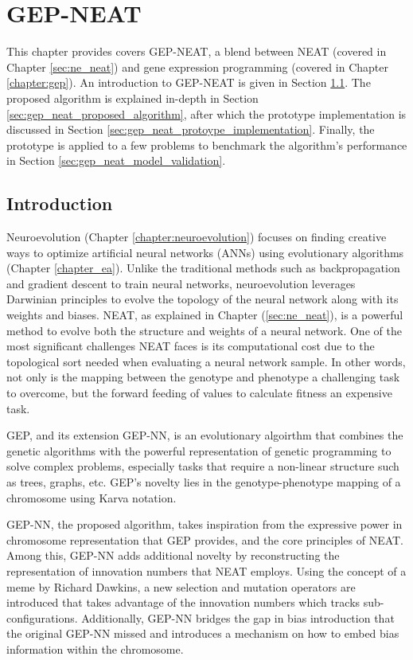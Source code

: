 \chapter{GEP-NEAT}\label{chapter:gep_neat}
This chapter provides covers GEP-NEAT, a blend between NEAT (covered in Chapter \ref{sec:ne_neat}) and gene expression programming (covered in Chapter \ref{chapter:gep}). An introduction to GEP-NEAT is given in Section \ref{sec:gep_neat_introduction}. The proposed algorithm is explained in-depth in Section \ref{sec:gep_neat_proposed_algorithm}, after which the prototype implementation is discussed in Section \ref{sec:gep_neat_protoype_implementation}. Finally, the prototype is applied to a few problems to benchmark the algorithm's performance in Section \ref{sec:gep_neat_model_validation}.

\section{Introduction}\label{sec:gep_neat_introduction}
Neuroevolution (Chapter \ref{chapter:neuroevolution}) focuses on finding creative ways to optimize artificial neural networks (ANNs) using evolutionary algorithms (Chapter \ref{chapter_ea}). Unlike the traditional methods such as backpropagation and gradient descent to train neural networks, neuroevolution leverages Darwinian principles to evolve the topology of the neural network along with its weights and biases. NEAT, as explained in Chapter (\ref{sec:ne_neat}), is a powerful method to evolve both the structure and weights of a neural network. One of the most significant challenges NEAT faces is its computational cost due to the topological sort needed when evaluating a neural network sample. In other words, not only is the mapping between the genotype and phenotype a challenging task to overcome, but the forward feeding of values to calculate fitness an expensive task. \bigskip

\noindent GEP, and its extension GEP-NN, is an evolutionary algoirthm that combines the genetic algorithms with the powerful representation of genetic programming to solve complex problems, especially tasks that require a non-linear structure such as trees, graphs, etc. GEP's novelty lies in the genotype-phenotype mapping of a chromosome using Karva notation. \bigskip

\noindent GEP-NN, the proposed algorithm, takes inspiration from the expressive power in chromosome representation that GEP provides, and the core principles of NEAT. Among this, GEP-NN adds additional novelty by reconstructing the representation of innovation numbers that NEAT employs. Using the concept of a meme by Richard Dawkins, a new selection and mutation operators are introduced that takes advantage of the innovation numbers which tracks sub-configurations. Additionally, GEP-NN bridges the gap in bias introduction that the original GEP-NN missed and introduces a mechanism on how to embed bias information within the chromosome.

